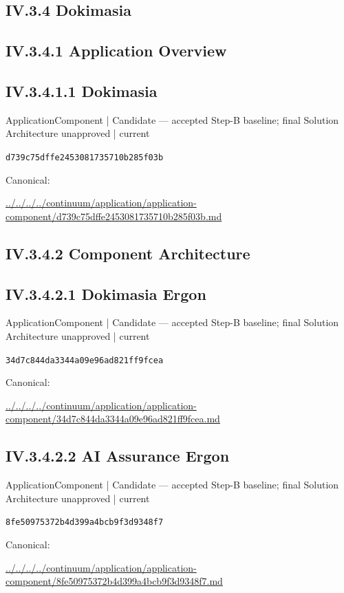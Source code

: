 \documentclass[10pt,a4paper]{article}
\begin{document}
\subsection*{IV.3.4 Dokimasia}
\subsection*{IV.3.4.1 Application Overview}
\subsection*{IV.3.4.1.1 Dokimasia}
{\small ApplicationComponent | Candidate — accepted Step-B baseline; final Solution Architecture unapproved | current}\par
\texttt{d739c75dffe2453081735710b285f03b}\par
Canonical: \par
{\footnotesize\url{../../../../continuum/application/application-component/d739c75dffe2453081735710b285f03b.md}}\par
\subsection*{IV.3.4.2 Component Architecture}
\subsection*{IV.3.4.2.1 Dokimasia Ergon}
{\small ApplicationComponent | Candidate — accepted Step-B baseline; final Solution Architecture unapproved | current}\par
\texttt{34d7c844da3344a09e96ad821ff9fcea}\par
Canonical: \par
{\footnotesize\url{../../../../continuum/application/application-component/34d7c844da3344a09e96ad821ff9fcea.md}}\par
\subsection*{IV.3.4.2.2 AI Assurance Ergon}
{\small ApplicationComponent | Candidate — accepted Step-B baseline; final Solution Architecture unapproved | current}\par
\texttt{8fe50975372b4d399a4bcb9f3d9348f7}\par
Canonical: \par
{\footnotesize\url{../../../../continuum/application/application-component/8fe50975372b4d399a4bcb9f3d9348f7.md}}\par
\end{document}
